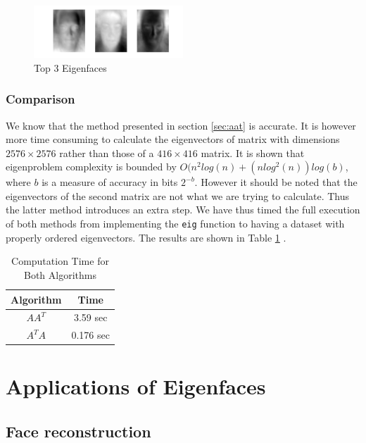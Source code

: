 \documentclass[10pt,twocolumn,letterpaper]{article}
\begin{document}
\begin{figure}[H]
\centering
\includegraphics[width=0.5\textwidth]{../results/Q1B_PCA_Eigenfaces}

  \caption{Top 3 Eigenfaces \label{fig:Eig4}}

\end{figure}
\subsubsection{Comparison}

We know that the method presented in section \ref{sec:aat} is accurate. It is however more time consuming to calculate the eigenvectors of matrix with dimensions $2576 \times 2576$ rather than those of a $416 \times 416$ matrix. It is shown \cite{Complex} that eigenproblem complexity is bounded by $O(n^2log(n)+(nlog^2(n))log(b)$, where $b$ is a measure of accuracy in bits $2^{-b}$. However it should be noted that the eigenvectors of the second matrix are not what we are trying to calculate. Thus the latter method introduces an extra step. We have thus timed the full execution of both methods from implementing the {\tt\small eig} function to having a dataset with properly ordered eigenvectors. The results are shown in Table \ref{tab:times1} .

\begin{table}[H]
\begin{center}
\begin{tabular}{||c c||}
\hline
\bf Algorithm & \bf Time\\ [0.5ex]
\hline
 $AA^T$ & 3.59 sec\\ [0.5ex]
\hline
 $A^TA$ & 0.176 sec \\ [0.5ex]
\hline
\end{tabular}
\end{center}
\caption{Computation Time for Both Algorithms} \label{tab:times1}
\end{table}

\section{Applications of Eigenfaces}
\subsection{Face reconstruction}
\end{document}

